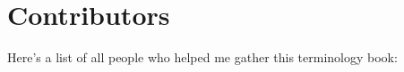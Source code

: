 \section{Contributors}
Here's a list of all people who helped me gather this terminology book:

\begin{multicols*}{2}

\end{multicols*}